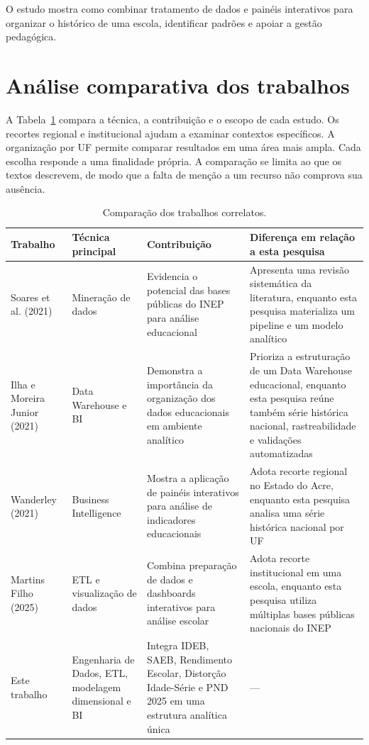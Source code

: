 O estudo mostra como combinar tratamento de dados e painéis interativos para organizar o histórico de uma escola, identificar padrões e apoiar a gestão pedagógica.

\section{Análise comparativa dos trabalhos}

A Tabela~\ref{tab:trabalhos-correlatos} compara a técnica, a contribuição e o escopo de cada estudo. Os recortes regional e institucional ajudam a examinar contextos específicos. A organização por UF permite comparar resultados em uma área mais ampla. Cada escolha responde a uma finalidade própria. A comparação se limita ao que os textos descrevem, de modo que a falta de menção a um recurso não comprova sua ausência.

\begin{table}[H]
\centering
\scriptsize
\caption[Comparação dos trabalhos correlatos]{Comparação dos trabalhos correlatos.}
\label{tab:trabalhos-correlatos}
\renewcommand{\arraystretch}{1.3}
\begin{tabular}{|p{2.1cm}|p{2.5cm}|p{4.1cm}|p{4.1cm}|}
\hline
\textbf{Trabalho} & \textbf{Técnica principal} & \textbf{Contribuição} & \textbf{Diferença em relação a esta pesquisa} \\ \hline

Soares et al. (2021) &
Mineração de dados &
Evidencia o potencial das bases públicas do INEP para análise educacional &
Apresenta uma revisão sistemática da literatura, enquanto esta pesquisa materializa um pipeline e um modelo analítico \\ \hline

Ilha e Moreira Junior (2021) &
Data Warehouse e BI &
Demonstra a importância da organização dos dados educacionais em ambiente analítico &
Prioriza a estruturação de um Data Warehouse educacional, enquanto esta pesquisa reúne também série histórica nacional, rastreabilidade e validações automatizadas \\ \hline

Wanderley (2021) &
Business Intelligence &
Mostra a aplicação de painéis interativos para análise de indicadores educacionais &
Adota recorte regional no Estado do Acre, enquanto esta pesquisa analisa uma série histórica nacional por UF \\ \hline

Martins Filho (2025) &
ETL e visualização de dados &
Combina preparação de dados e dashboards interativos para análise escolar &
Adota recorte institucional em uma escola, enquanto esta pesquisa utiliza múltiplas bases públicas nacionais do INEP \\ \hline

Este trabalho &
Engenharia de Dados, ETL, modelagem dimensional e BI &
Integra IDEB, SAEB, Rendimento Escolar, Distorção Idade-Série e PND 2025 em uma estrutura analítica única &
— \\ \hline

\end{tabular}
\end{table}

